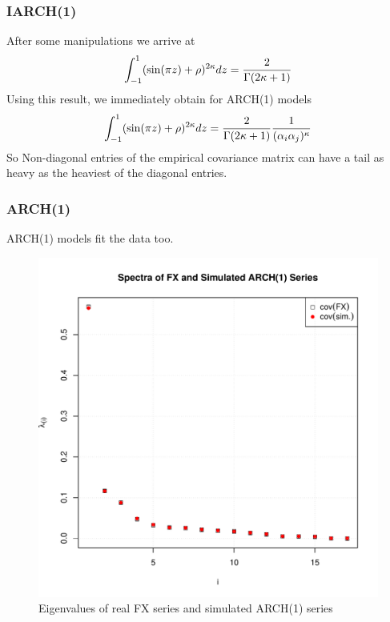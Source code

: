 \documentclass{beamer}
\begin{document}
\begin{frame}
  \frametitle{IARCH(1)}
  After some manipulations we arrive at
  \begin{equation}
    \int_{-1}^1 (\sin(\pi z) + \rho)^{2\kappa} dz = {2 \over \Gamma(2\kappa + 1)}
  \end{equation}
  Using this result, we immediately obtain for ARCH(1) models
  \begin{equation*}
    \int_{-1}^1 (\sin(\pi z) + \rho)^{2\kappa} dz =
    {2 \over \Gamma(2\kappa + 1)}
    {1 \over (\alpha_{i} \alpha_{j})^\kappa}
  \end{equation*}
  So Non-diagonal entries of the empirical covariance matrix can have
  a tail as heavy as the heaviest of the diagonal entries.
\end{frame}


\begin{frame}
  \frametitle{ARCH(1)}  
  ARCH(1) models fit the data too.
  \begin{figure}[htb!]
    \centering
    \includegraphics[scale=0.35]{FX_ARCH_eigenvalues.pdf}
    \caption{\tiny Eigenvalues of real FX series and simulated ARCH(1) series}
  \end{figure}
\end{frame}
\end{document}

